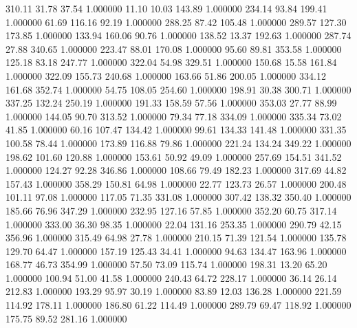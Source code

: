     310.11     31.78     37.54  1.000000
     11.10     10.03    143.89  1.000000
    234.14     93.84    199.41  1.000000
     61.69    116.16     92.19  1.000000
    288.25     87.42    105.48  1.000000
    289.57    127.30    173.85  1.000000
    133.94    160.06     90.76  1.000000
    138.52     13.37    192.63  1.000000
    287.74     27.88    340.65  1.000000
    223.47     88.01    170.08  1.000000
     95.60     89.81    353.58  1.000000
    125.18     83.18    247.77  1.000000
    322.04     54.98    329.51  1.000000
    150.68     15.58    161.84  1.000000
    322.09    155.73    240.68  1.000000
    163.66     51.86    200.05  1.000000
    334.12    161.68    352.74  1.000000
     54.75    108.05    254.60  1.000000
    198.91     30.38    300.71  1.000000
    337.25    132.24    250.19  1.000000
    191.33    158.59     57.56  1.000000
    353.03     27.77     88.99  1.000000
    144.05     90.70    313.52  1.000000
     79.34     77.18    334.09  1.000000
    335.34     73.02     41.85  1.000000
     60.16    107.47    134.42  1.000000
     99.61    134.33    141.48  1.000000
    331.35    100.58     78.44  1.000000
    173.89    116.88     79.86  1.000000
    221.24    134.24    349.22  1.000000
    198.62    101.60    120.88  1.000000
    153.61     50.92     49.09  1.000000
    257.69    154.51    341.52  1.000000
    124.27     92.28    346.86  1.000000
    108.66     79.49    182.23  1.000000
    317.69     44.82    157.43  1.000000
    358.29    150.81     64.98  1.000000
     22.77    123.73     26.57  1.000000
    200.48    101.11     97.08  1.000000
    117.05     71.35    331.08  1.000000
    307.42    138.32    350.40  1.000000
    185.66     76.96    347.29  1.000000
    232.95    127.16     57.85  1.000000
    352.20     60.75    317.14  1.000000
    333.00     36.30     98.35  1.000000
     22.04    131.16    253.35  1.000000
    290.79     42.15    356.96  1.000000
    315.49     64.98     27.78  1.000000
    210.15     71.39    121.54  1.000000
    135.78    129.70     64.47  1.000000
    157.19    125.43     34.41  1.000000
     94.63    134.47    163.96  1.000000
    168.77     46.73    354.99  1.000000
     57.50     73.09    115.74  1.000000
    198.31     13.20     65.20  1.000000
    100.94     51.00     41.58  1.000000
    240.43     64.72    228.17  1.000000
     36.14     26.14    212.83  1.000000
    193.29     95.97     30.19  1.000000
     83.89     12.03    136.28  1.000000
    221.59    114.92    178.11  1.000000
    186.80     61.22    114.49  1.000000
    289.79     69.47    118.92  1.000000
    175.75     89.52    281.16  1.000000
